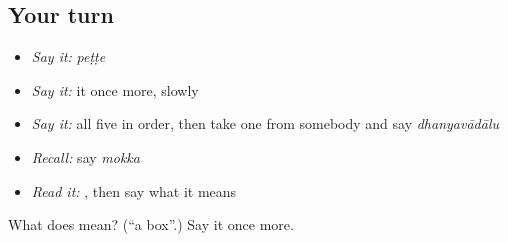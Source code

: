 \subsection*{Your turn}
\begin{itemize}
\raggedright
  \item \emph{Say it:} \emph{peṭṭe}
  \item \emph{Say it:} it once more, slowly
  \item \emph{Say it:} all five in order, then take one from somebody and say \emph{dhanyavādālu}
  \item \emph{Recall:} say \emph{mokka}
  \item \emph{Read it:} \textbf{}, then say what it means
\end{itemize}

\begin{tcolorbox}[breakable,colback=teal!4,colframe=teal!35!black,title={Before you move on}]
What does  mean? (\textquotedblleft{}a box\textquotedblright{}.) Say it once more.
\end{tcolorbox}
